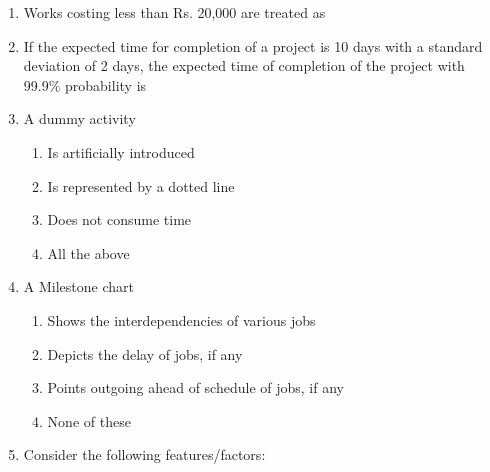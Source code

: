 \documentclass[11pt,a4paper]{article}
\begin{document}
\begin{enumerate}
\\
\item{Works costing less than Rs. 20,000 are treated as}
\\
\item{If the expected time for completion of a project is 10 days with a standard deviation of 2 days, the expected time of completion of the project with 99.9\% probability is}
\\
\item{A dummy activity}
\begin{enumerate}[label=\Alph*.]
\item{Is artificially introduced}
\item{Is represented by a dotted line}
\item{Does not consume time}
\item{All the above}
\end{enumerate}
\item{A Milestone chart}
\begin{enumerate}[label=\Alph*.]
\item{Shows the interdependencies of various jobs}
\item{Depicts the delay of jobs, if any}
\item{Points outgoing ahead of schedule of jobs, if any}
\item{None of these}
\end{enumerate}
\item{Consider the following features/factors: \\
}
\end{enumerate}
\end{document}
